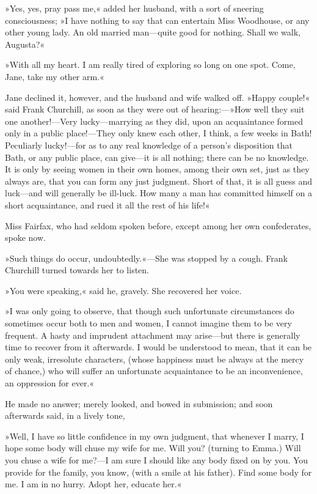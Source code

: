 »Yes, yes, pray pass me,« added her husband, with a sort of sneering consciousness; »I have nothing to say that can entertain Miss Woodhouse, or any other young lady. An old married man—quite good for nothing. Shall we walk, Augusta?«

»With all my heart. I am really tired of exploring so long on one spot. Come, Jane, take my other arm.«

Jane declined it, however, and the husband and wife walked off. »Happy couple!« said Frank Churchill, as soon as they were out of hearing:—»How well they suit one another!—Very lucky—marrying as they did, upon an acquaintance formed only in a public place!—They only knew each other, I think, a few weeks in Bath! Peculiarly lucky!—for as to any real knowledge of a person's disposition that Bath, or any public place, can give—it is all nothing; there can be no knowledge. It is only by seeing women in their own homes, among their own set, just as they always are, that you can form any just judgment. Short of that, it is all guess and luck—and will generally be ill-luck. How many a man has committed himself on a short acquaintance, and rued it all the rest of his life!«

Miss Fairfax, who had seldom spoken before, except among her own confederates, spoke now.

»Such things do occur, undoubtedly.«—She was stopped by a cough. Frank Churchill turned towards her to listen.

»You were speaking,« said he, gravely. She recovered her voice.

»I was only going to observe, that though such unfortunate circumstances do sometimes occur both to men and women, I cannot imagine them to be very frequent. A hasty and imprudent attachment may arise—but there is generally time to recover from it afterwards. I would be understood to mean, that it can be only weak, irresolute characters, (whose happiness must be always at the mercy of chance,) who will suffer an unfortunate acquaintance to be an inconvenience, an oppression for ever.«

He made no answer; merely looked, and bowed in submission; and soon afterwards said, in a lively tone,

»Well, I have so little confidence in my own judgment, that whenever I marry, I hope some body will chuse my wife for me. Will you? (turning to Emma.) Will you chuse a wife for me?—I am sure I should like any body fixed on by you. You provide for the family, you know, (with a smile at his father). Find some body for me. I am in no hurry. Adopt her, educate her.«

